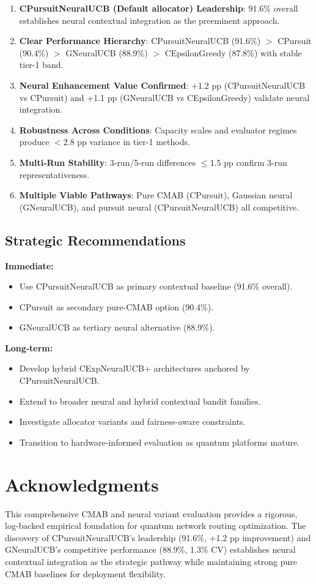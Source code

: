 \documentclass[12pt,a4paper]{article}
\newcommand{\success}[1]{\textcolor{successcolor}{\textbf{#1}}}
\newcommand{\neural}[1]{\textcolor{neuralcolor}{\textbf{#1}}}
\begin{document}
\begin{enumerate}
\item \neural{CPursuitNeuralUCB (Default allocator) Leadership}: 91.6\% overall establishes neural contextual integration as the preeminent approach.
\item \textbf{Clear Performance Hierarchy}: CPursuitNeuralUCB (91.6\%) $>$ CPursuit (90.4\%) $>$ GNeuralUCB (88.9\%) $>$ CEpsilonGreedy (87.8\%) with stable tier-1 band.
\item \neural{Neural Enhancement Value Confirmed}: +1.2 pp (CPursuitNeuralUCB vs CPursuit) and +1.1 pp (GNeuralUCB vs CEpsilonGreedy) validate neural integration.
\item \success{Robustness Across Conditions}: Capacity scales and evaluator regimes produce $<$2.8 pp variance in tier-1 methods.
\item \success{Multi-Run Stability}: 3-run/5-run differences $\leq$1.5 pp confirm 3-run representativeness.
\item \textbf{Multiple Viable Pathways}: Pure CMAB (CPursuit), Gaussian neural (GNeuralUCB), and pursuit neural (CPursuitNeuralUCB) all competitive.
\end{enumerate}

\subsection{Strategic Recommendations}

\textbf{Immediate:}
\begin{itemize}
\item Use CPursuitNeuralUCB as primary contextual baseline (91.6\% overall).
\item CPursuit as secondary pure-CMAB option (90.4\%).
\item GNeuralUCB as tertiary neural alternative (88.9\%).
\end{itemize}

\textbf{Long-term:}
\begin{itemize}
\item Develop hybrid CExpNeuralUCB+ architectures anchored by CPursuitNeuralUCB.
\item Extend to broader neural and hybrid contextual bandit families.
\item Investigate allocator variants and fairness-aware constraints.
\item Transition to hardware-informed evaluation as quantum platforms mature.
\end{itemize}

\section{Acknowledgments}

This comprehensive CMAB and neural variant evaluation provides a rigorous, log-backed empirical foundation for quantum network routing optimization. The discovery of CPursuitNeuralUCB's leadership (91.6\%, +1.2 pp improvement) and GNeuralUCB's competitive performance (88.9\%, 1.3\% CV) establishes neural contextual integration as the strategic pathway while maintaining strong pure CMAB baselines for deployment flexibility.
\end{document}
